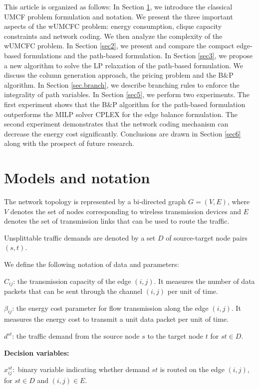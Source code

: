 This article is organized as follows: In Section \ref{sec1}, we introduce the classical UMCF problem formulation and notation.
We present the three important aspects of the wUMCFC problem: energy consumption, clique capacity constraints and network coding. We then analyze the complexity of the wUMCFC problem.
In Section \ref{sec2}, we present and compare the compact edge-based formulations and the path-based formulation. In Section \ref{sec3}, we propose a new algorithm to solve the LP relaxation of the path-based formulation. We discuss the column generation approach, the pricing problem and the B\(\&\)P algorithm. In Section \ref{sec.branch}, we describe branching rules to enforce the integrality of path variables. In Section \ref{sec5}, we perform two experiments. The first experiment shows that the B\(\&\)P algorithm for the path-based formulation outperforms the MILP solver CPLEX for the edge balance formulation. The second experiment demonstrates that the network coding mechanism can decrease the energy cost significantly. Conclusions are drawn in Section \ref{sec6} along with the prospect of future research.

\section{Models and notation}
\label{sec1}
The network topology is represented by a
bi-directed graph \(G = (V, E)\), where \(V\) denotes the set of nodes corresponding to wireless transmission devices and \(E\) denotes the set of transmission links that can be used to route the traffic.

Unsplittable traffic demands are denoted by a set \( D \) of source-target node pairs \((s,t)\).

We define the following notation of data and parameters:

\(C_{ij}\): the transmission capacity of the edge \( (i,j) \). It measures the number of data packets that can be sent through the channel \((i,j)\) per unit of time.

\(\beta_{ij}\): the energy cost parameter for flow transmission along the edge \((i,j)\). It measures the energy cost to transmit a unit data packet per unit of time.

\(d^{st}\): the traffic demand from the source node \(s\) to the target node \(t\) for \(st \in D\).


\textbf{Decision variables:}

\(x^{st}_{ij}: \) binary variable indicating whether demand \(st\) is routed on the edge \((i,j)\), for $st \in D$ and $(i,j) \in E$.

